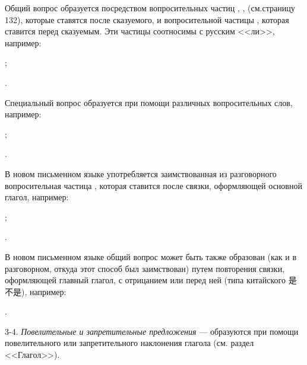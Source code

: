 Общий вопрос образуется посредством вопросительных частиц
, ,  (см.страницу 132), которые ставятся после сказуемого, и вопросительной частицы , которая ставится перед сказуемым. Эти частицы соотносимы с русским <<ли>>, например:
\begin{prfsample}
	\item {};
	\item {}.
\end{prfsample}

Специальный вопрос образуется при помощи различных вопросительных слов, например:	
\begin{prfsample}
	\item {};
	\item {}.
\end{prfsample}

В новом письменном языке употребляется заимствованная из разговорного вопросительная частица	, которая ставится после связки, оформляющей основной глагол, например:
\begin{prfsample}
	\item {};
	\item {}.
\end{prfsample}

В новом письменном языке общий вопрос может быть также образован (как и в разговорном, откуда этот способ был заимствован) путем повторения связки, оформляющей главный глагол, с отрицанием  или  перед ней (типа китайского {\chinfont 是不是}), например:
\begin{prfsample}
	\item {}.
\end{prfsample}

3-4. \emph{Повелительные и запретительные предложения} --- образуются при помощи повелительного или запретительного наклонения глагола (см. раздел <<Глагол>>).

